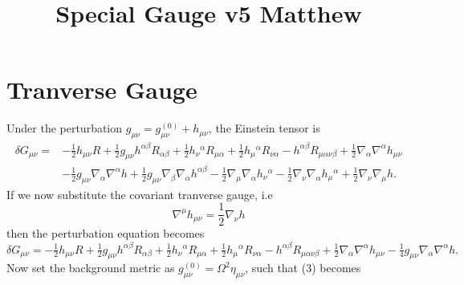 \documentclass[10pt,letterpaper]{article}
\title{Special Gauge v5 Matthew}
\date{}
\begin{document}
\maketitle
\noindent
\section*{Tranverse Gauge}
Under the perturbation $g_{\mu\nu} = g_{\mu\nu}^{(0)} +h_{\mu\nu}$, the Einstein tensor is
\begin{align}
\delta G_{\mu\nu}={}&- \tfrac{1}{2} h_{\mu \nu} R
 + \tfrac{1}{2} g_{\mu \nu} h^{\alpha \beta} R_{\alpha \beta}
 + \tfrac{1}{2} h_{\nu}{}^{\alpha} R_{\mu \alpha}
 + \tfrac{1}{2} h_{\mu}{}^{\alpha} R_{\nu \alpha}
 -  h^{\alpha \beta} R_{\mu \alpha \nu \beta}
 + \tfrac{1}{2} \nabla_{\alpha}\nabla^{\alpha}h_{\mu \nu}\nonumber\\
& -  \tfrac{1}{2} g_{\mu \nu} \nabla_{\alpha}\nabla^{\alpha}h
 + \tfrac{1}{2} g_{\mu \nu} \nabla_{\beta}\nabla_{\alpha}h^{\alpha \beta}
 -  \tfrac{1}{2} \nabla_{\mu}\nabla_{\alpha}h_{\nu}{}^{\alpha}
 -  \tfrac{1}{2} \nabla_{\nu}\nabla_{\alpha}h_{\mu}{}^{\alpha}
 + \tfrac{1}{2} \nabla_{\nu}\nabla_{\mu}h.
\end{align}
If we now substitute the covariant tranverse gauge, i.e
\begin{equation}
	\nabla^\mu h_{\mu\nu} = \frac12 \nabla_\nu h
\end{equation}
then the perturbation equation becomes
\begin{equation}
\delta G_{\mu\nu}=- \tfrac{1}{2} h_{\mu \nu} R + \tfrac{1}{2} g_{\mu \nu} h^{\alpha \beta} R_{\alpha \beta} + \tfrac{1}{2} h_{\nu}{}^{\alpha} R_{\mu \alpha} + \tfrac{1}{2} h_{\mu}{}^{\alpha} R_{\nu \alpha} -  h^{\alpha \beta} R_{\mu \alpha \nu \beta} + \tfrac{1}{2} \nabla_{\alpha}\nabla^{\alpha}h_{\mu \nu} -  \tfrac{1}{4} g_{\mu \nu} \nabla_{\alpha}\nabla^{\alpha}h.
\end{equation}
Now set the background metric as $g_{\mu\nu}^{(0)} = \Omega^2 \eta_{\mu\nu}$, such that (3) becomes
\end{document}
